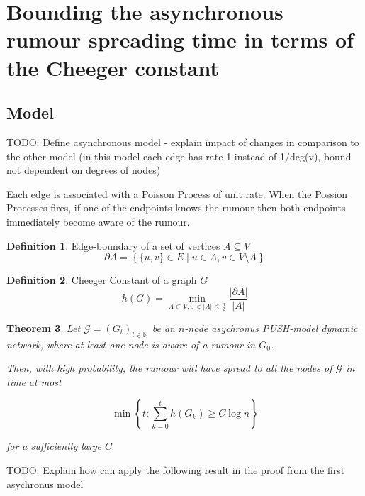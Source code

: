 \documentclass[a4paper,11pt]{article}
\newtheorem{theorem}{Theorem}[section]
\theoremstyle{definition}
\newtheorem{definition}[theorem]{Definition}
\begin{document}
\section{Bounding the asynchronous rumour spreading time in terms of the Cheeger constant}
\label{AsyncCheegerBound}

\subsection{Model}

TODO: Define asynchronous model - explain impact of changes in comparison to the other model (in this model each edge has rate 1 instead of 1/deg(v), bound not dependent on degrees of nodes)


Each edge is associated with a Poisson Process of unit rate. When the Possion Processes fires, if one of the endpoints knows the rumour then both endpoints immediately become aware of the rumour. 

\begin{definition}
	Edge-boundary of a set of vertices $A \subseteq V$
	$$
		\partial A = \left\{ \{u, v\} \in E \mid u \in A, v \in V \setminus A \right\} 
	$$
\end{definition}

\begin{definition}
	Cheeger Constant of a graph $G$
	$$
		h(G) = \min_{A \subset V, 0 < |A| \leq \frac{n}{2}} \frac{|\partial A|}{|A|}
	$$

\end{definition}

\begin{theorem}
	Let $\mathcal{G} = (G_t)_{t \in \mathbb{N}}$ be an $n$-node asychronus PUSH-model dynamic network, where at least one node is aware of a rumour in $G_0$.

	Then, with high probability, the rumour will have spread to all the nodes of $\mathcal{G}$ in time at most

	$$
		\min \left\{t : \sum_{k=0}^t h(G_k) \geq C \log n \right\} 
	$$

	\noindent
	for a sufficiently large $C$
\end{theorem}

TODO: Explain how can apply the following result in the proof from the first asychronus model
\end{document}
